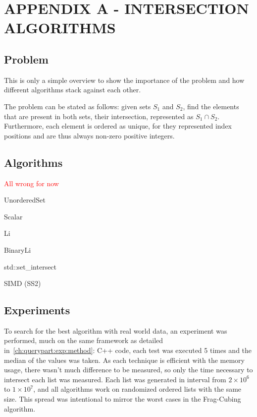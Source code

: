 
\hypertarget{appendix:a}{} %
\renewcommand{\thechapter}{}%
\chapter{APPENDIX A - INTERSECTION ALGORITHMS}
\label{ap:a}
\renewcommand{\thechapter}{A}

\section{Problem}\label{ap:a:problem}

This is only a simple overview to show the importance of the problem and how different algorithms stack against each other.

The problem can be stated as follows: given sets $S_1$ and $S_2$, find the elements that are present in both sets, their intersection, represented as $S_1 \cap S_2$.
Furthermore, each element is ordered as unique, for they represented index positions and are thus always non-zero positive integers.

\section{Algorithms}\label{ap:a:algos}

\textcolor{red}{All wrong for now}

UnorderedSet

Scalar

Li

BinaryLi

std::set\_intersect

SIMD (SS2)


\section{Experiments}\label{ap:a:results}

To search for the best algorithm with real world data, an experiment was performed, much on the same framework as detailed in~\ref{ch:querypart:exp:method}: C++ code, each test was executed 5 times and the median of the values was taken.
As each technique is efficient with the memory usage, there wasn't much difference to be measured, so only the time necessary to intersect each list was measured.
Each list was generated in interval from $2\times10^6$ to $1\times10^7$, and all algorithms work on randomized ordered lists with the same size.
This spread was intentional to mirror the worst cases in the Frag-Cubing algorithm.

